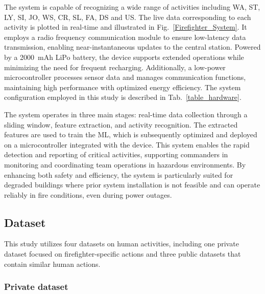 \documentclass[journal,twoside,web]{ieeecolor}
\begin{document}
The system is capable of recognizing a wide range of activities including WA, ST, LY, SI, JO, WS, CR, SL, FA, DS and US. The live data corresponding to each activity is plotted in real-time and illustrated in Fig.~\ref{Firefighter_System}. It employs a radio frequency communication module to ensure low-latency data transmission, enabling near-instantaneous updates to the central station. Powered by a 2000~mAh LiPo battery, the device supports extended operations while minimizing the need for frequent recharging. Additionally, a low-power microcontroller processes sensor data and manages communication functions, maintaining high performance with optimized energy efficiency. The system configuration employed in this study is described in Tab.~\ref{table_hardware}.

The system operates in three main stages: real-time data collection through a sliding window, feature extraction, and activity recognition. The extracted features are used to train the ML, which is subsequently optimized and deployed on a microcontroller integrated with the device. This system enables the rapid detection and reporting of critical activities, supporting commanders in monitoring and coordinating team operations in hazardous environments. By enhancing both safety and efficiency, the system is particularly suited for degraded buildings where prior system installation is not feasible and can operate reliably in fire conditions, even during power outages.

\subsection{Dataset}\label{Dataset}

This study utilizes four datasets on human activities, including one private dataset focused on firefighter-specific actions and three public datasets that contain similar human actions.

\subsubsection{Private dataset}
\end{document}
